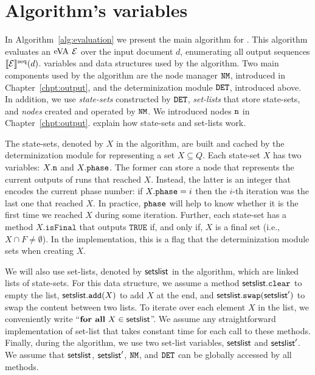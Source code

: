 \section{Algorithm's variables} 
In Algorithm~\ref{alg:evaluation} we present the main algorithm for \rematch.
This algorithm evaluates an $\mathrm{eVA}$ $\mathcal{E}$ over the input document $d$,
enumerating all output sequences $\llbracket\mathcal{E}\rrbracket^{\operatorname{seq}}(d)$. %
variables and data structures used by the algorithm.
%
Two main components used by the algorithm are the node manager $\mathtt{NM}$, introduced
in Chapter~\ref{chpt:output}, and the determinization module $\mathtt{DET}$, introduced
above. In addition, we use \emph{state-sets} constructed by $\mathtt{DET}$,
\emph{set-lists} that store state-sets, and \emph{nodes} created and operated by
$\mathtt{NM}$. We introduced nodes $\mathtt{n}$ in Chapter~\ref{chpt:output}. %
explain how state-sets and set-lists work.


The state-sets, denoted by $X$ in the algorithm, are built and cached by the
determinization module for representing a set $X \subseteq Q$. Each state-set
$X$ has two variables: $X.\mathtt{n}$ and $X.\texttt{phase}$. The former can store a node
that represents the current outputs of runs that reached $X$. Instead, the
latter is an integer that encodes the current phase number: if $X.\texttt{phase} = i$
then the $i$-th iteration was the last one that reached $X$. In practice,
$\texttt{phase}$ will help to know whether it is the first time we reached $X$ during
some iteration. Further, each state-set has a method $X.\texttt{isFinal}$ that
outputs $\texttt{TRUE}$ if, and only if, $X$ is a final set (i.e., $X \cap F
\neq \emptyset$). In the implementation, this is a flag that the determinization
module sets when creating $X$.

We will also use set-lists, denoted by $\textsf{setslist}$ in the algorithm, which
are linked lists of state-sets. For this data structure, we assume a method
$\textsf{setslist}.\texttt{clear}$ to empty the list,
$\textsf{setslist}.\texttt{add}(X)$ to add $X$ at the end, and
$\textsf{setslist}.\texttt{swap}(\textsf{setslist}')$ to swap the content between two
lists. To iterate over each element $X$ in the list, we conveniently write
``$\textbf{for all} \ X \in \textsf{setslist}$''. We assume any straightforward
implementation of set-list that takes constant time for each call to these
methods. Finally, during the algorithm, we use two set-list variables,
$\textsf{setslist}$ and $\textsf{setslist}'$. We assume that $\textsf{setslist}$,
$\textsf{setslist}'$, $\mathtt{NM}$, and $\mathtt{DET}$ can be globally accessed by all methods.

